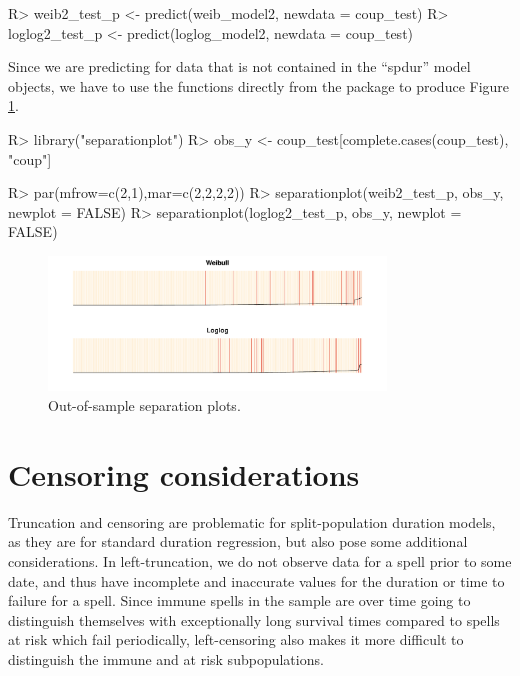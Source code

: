 \documentclass[article]{jss}
\begin{document}
\begin{CodeChunk}
\begin{CodeInput}
R> weib2_test_p   <- predict(weib_model2, newdata = coup_test)
R> loglog2_test_p <- predict(loglog_model2, newdata = coup_test)
\end{CodeInput}
\end{CodeChunk}

Since we are predicting for data that is not contained in the ``spdur''
model objects, we have to use the  functions
directly from the package to produce Figure \ref{oos-sepplots}.

\begin{CodeChunk}
\begin{CodeInput}
R> library("separationplot")
R> obs_y <- coup_test[complete.cases(coup_test), "coup"]

R> par(mfrow=c(2,1),mar=c(2,2,2,2))
R> separationplot(weib2_test_p,   obs_y, newplot = FALSE)
R> separationplot(loglog2_test_p, obs_y, newplot = FALSE)
\end{CodeInput}
\end{CodeChunk}

\begin{figure}
\begin{center}
\includegraphics[width=0.8\textwidth]{graphics/oos-sepplots.pdf}
\caption{Out-of-sample separation plots.}
\label{oos-sepplots}
\end{center}
\end{figure}

\section{Censoring considerations}

Truncation and censoring are problematic for split-population duration
models, as they are for standard duration regression, but also pose some
additional considerations. In left-truncation, we do not observe data
for a spell prior to some date, and thus have incomplete and inaccurate
values for the duration or time to failure for a spell. Since immune
spells in the sample are over time going to distinguish themselves with
exceptionally long survival times compared to spells at risk which fail
periodically, left-censoring also makes it more difficult to distinguish
the immune and at risk subpopulations.
\end{document}
